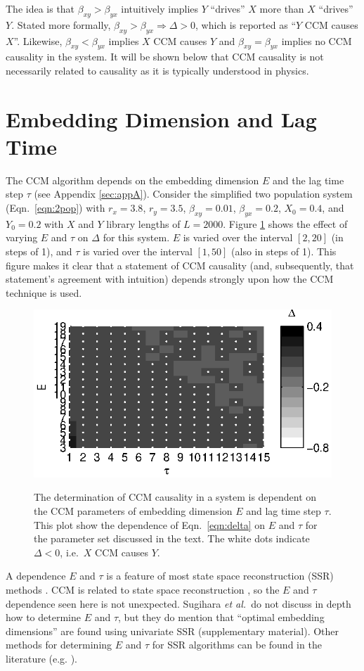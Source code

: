 \documentclass[a4paper,11pt,twocolumn]{article}
\begin{document}
The idea is that $\beta_{xy}>\beta_{yx}$ intuitively implies $Y$ ``drives'' $X$ more than $X$ ``drives'' $Y$.  Stated more formally, $\beta_{xy}>\beta_{yx}\Rightarrow\Delta>0$, which is reported as ``$Y$ CCM causes $X$''.  Likewise, $\beta_{xy}<\beta_{yx}$ implies $X$ CCM causes $Y$ and $\beta_{xy}=\beta_{yx}$ implies no CCM causality in the system.  It will be shown below that CCM causality is not necessarily related to causality as it is typically understood in physics.

\section{Embedding Dimension and Lag Time}
The CCM algorithm depends on the embedding dimension $E$ and the lag time step $\tau$ (see Appendix \ref{sec:appA}).  Consider the simplified two population system (Eqn.\ \ref{eqn:2pop}) with $r_x=3.8$, $r_y=3.5$, $\beta_{xy}=0.01$, $\beta_{yx}=0.2$, $X_0=0.4$, and $Y_0=0.2$ with $X$ and $Y$ library lengths of $L=2000$.  Figure \ref{fig:Etau} shows the effect of varying $E$ and $\tau$ on $\Delta$ for this system.  $E$ is varied over the interval $[2,20]$ (in steps of 1), and $\tau$ is varied over the interval $[1,50]$ (also in steps of 1).  This figure makes it clear that a statement of CCM causality (and, subsequently, that statement's agreement with intuition) depends strongly upon how the CCM technique is used.
\begin{figure}[ht]
\label{fig:Etau}
\includegraphics[scale=1.0]{Figure2_Etau.eps}\\
\caption{The determination of CCM causality in a system is dependent on the CCM parameters of embedding dimension $E$ and lag time step $\tau$.  This plot show the dependence of Eqn.\ \ref{eqn:delta} on $E$ and $\tau$ for the parameter set discussed in the text.  The white dots indicate $\Delta<0$, i.e.\ $X$ CCM causes $Y$.}
\end{figure}
A dependence $E$ and $\tau$ is a feature of most state space reconstruction (SSR) methods \cite{Hong2006,vlachos2009,Small2004}.  CCM is related to state space reconstruction \cite{Sugihara2012}, so the $E$ and $\tau$ dependence seen here is not unexpected.  Sugihara {\em et al.\ }do not discuss in depth how to determine $E$ and $\tau$, but they do mention that ``optimal embedding dimensions'' are found using univariate SSR \cite{Sugihara2012} (supplementary material).  Other methods for determining $E$ and $\tau$ for SSR algorithms can be found in the literature (e.g. \cite{Hong2006,Small2004,Kennel1992}).
\end{document}
